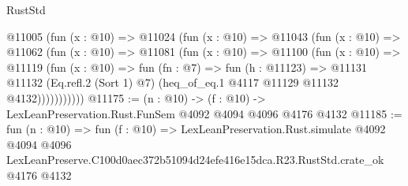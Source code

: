\begin{lexlean}{RustStd}
\begin{coremodule}
        @11005
          (fun (x : @10) =>
          @11024
            (fun (x : @10) =>
            @11043
              (fun (x : @10) =>
              @11062
                (fun (x : @10) =>
                @11081
                  (fun (x : @10) =>
                  @11100
                    (fun (x : @10) =>
                    @11119
                      (fun (x : @10) =>
                      fun (fn : @7) =>
                      fun (h : @11123) =>
                      @11131
                        @11132
                        (Eq.refl.{2} (Sort 1) @7)
                        (heq_of_eq.{1} @4117 @11129 @11132 @4132)))))))))))
@11175 := (n : @10) -> (f : @10) -> LexLeanPreservation.Rust.FunSem @4092 @4094 @4096 @4176 @4132
@11185 := fun (n : @10) =>
  fun (f : @10) =>
  LexLeanPreservation.Rust.simulate
    @4092
    @4094
    @4096
    LexLeanPreserve.C100d0aec372b51094d24efe416e15dca.R23.RustStd.crate_ok
    @4176
    @4132
\end{coremodule}
\end{lexlean}
